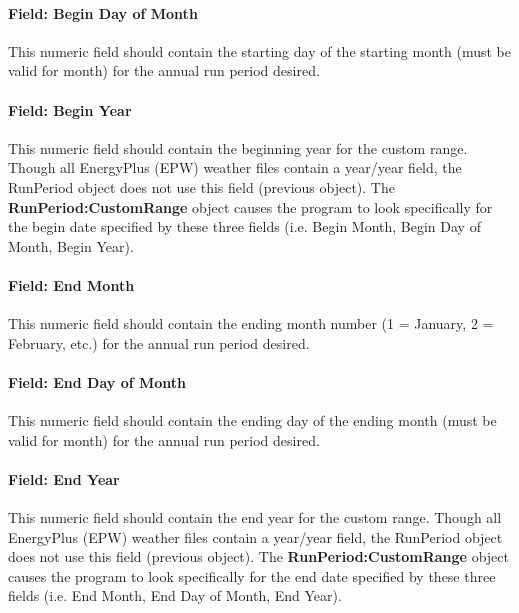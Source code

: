 \paragraph{Field: Begin Day of Month}\label{field-begin-day-of-month-2}

This numeric field should contain the starting day of the starting month (must be valid for month) for the annual run period desired.

\paragraph{Field: Begin Year}\label{field-begin-year}

This numeric field should contain the beginning year for the custom range. Though all EnergyPlus (EPW) weather files contain a year/year field, the RunPeriod object does not use this field (previous object). The \textbf{RunPeriod:CustomRange} object causes the program to look specifically for the begin date specified by these three fields (i.e. Begin Month, Begin Day of Month, Begin Year).

\paragraph{Field: End Month}\label{field-end-month-2}

This numeric field should contain the ending month number (1 = January, 2 = February, etc.) for the annual run period desired.

\paragraph{Field: End Day of Month}\label{field-end-day-of-month-2}

This numeric field should contain the ending day of the ending month (must be valid for month) for the annual run period desired.

\paragraph{Field: End Year}\label{field-end-year}

This numeric field should contain the end year for the custom range. Though all EnergyPlus (EPW) weather files contain a year/year field, the RunPeriod object does not use this field (previous object). The \textbf{RunPeriod:CustomRange} object causes the program to look specifically for the end date specified by these three fields (i.e. End Month, End Day of Month, End Year).

